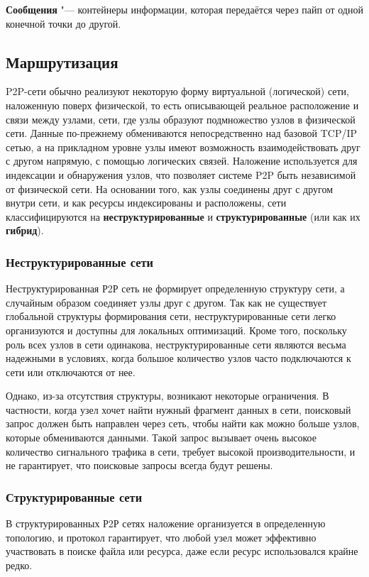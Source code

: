 \documentclass[bachelor, och, coursework]{SCWorks}
\begin{document}
\textbf{Сообщения} "--- контейнеры информации, которая передаётся через пайп от одной конечной точки до другой.

\subsection{Маршрутизация}
P2P-сети обычно реализуют некоторую форму виртуальной (логической) сети, наложенную поверх физической, то есть описывающей реальное расположение
и связи между узлами, сети, где узлы образуют подмножество узлов в физической сети. 
Данные по-прежнему обмениваются непосредственно над базовой TCP/IP сетью, 
а на прикладном уровне узлы имеют возможность взаимодействовать друг с другом напрямую, 
с помощью логических связей. Наложение используется для индексации и обнаружения узлов, 
что позволяет системе P2P быть независимой от физической сети. На основании того, как узлы соединены 
друг с другом внутри сети, и как ресурсы индексированы и расположены, сети классифицируются на 
\textbf{неструктурированные} и \textbf{структурированные} (или как их \textbf{гибрид}).

\subsubsection{Неструктурированные сети}
Неструктурированная Р2Р сеть не формирует определенную структуру сети, а случайным образом соединяет узлы друг с другом. 
Так как не существует глобальной структуры формирования сети, неструктурированные сети легко организуются и доступны для локальных оптимизаций. 
Кроме того, поскольку роль всех узлов в сети одинакова, неструктурированные сети являются весьма надежными в условиях, 
когда большое количество узлов часто подключаются к сети или отключаются от нее.

Однако, из-за отсутствия структуры, возникают некоторые ограничения. 
В частности, когда узел хочет найти нужный фрагмент данных в сети, поисковый запрос должен быть направлен через сеть, 
чтобы найти как можно больше узлов, которые обмениваются данными. Такой запрос вызывает очень высокое количество сигнального трафика в сети, 
требует высокой производительности, и не гарантирует, что поисковые запросы всегда будут решены.

\subsubsection{Структурированные сети}
В структурированных Р2Р сетях наложение организуется в определенную топологию, и протокол гарантирует, 
что любой узел может эффективно участвовать в поиске файла или ресурса, даже если ресурс использовался крайне редко.
\end{document}
